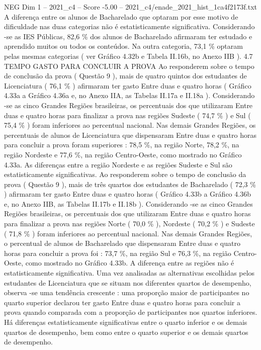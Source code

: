 \begin{textsample}{NEG Dim 1 – 2021\_c4 – Score -5.00 – 2021\_c4/enade\_2021\_hist\_1ca4f2173f.txt}
A diferença entre os alunos de Bacharelado que optaram por esse motivo de dificuldade nas duas categorias não é estatisticamente significativa.
Considerando -se as IES Públicas, 82,6 \% dos alunos de Bacharelado afirmaram ter estudado e aprendido muitos ou todos os conteúdos.
Na outra categoria, 73,1 \% optaram pelas mesmas categorias ( ver Gráfico 4.32b e Tabela II.16b, no Anexo IIB ). 4.7 TEMPO GASTO PARA CONCLUIR A PROVA Ao responderem sobre o tempo de conclusão da prova ( Questão 9 ), mais de quatro quintos dos estudantes de Licenciatura ( 76,1 \% ) afirmaram ter gasto Entre duas e quatro horas ( Gráfico 4.33a a Gráfico 4.36a e, no Anexo IIA, as Tabelas II.17a e II.18a ).
Considerando -se as cinco Grandes Regiões brasileiras, os percentuais dos que utilizaram Entre duas e quatro horas para finalizar a prova nas regiões Sudeste ( 74,7 \% ) e Sul ( 75,4 \% ) foram inferiores ao percentual nacional.
Nas demais Grandes Regiões, os percentuais de alunos de Licenciatura que dispensaram Entre duas e quatro horas para concluir a prova foram superiores : 78,5 \%, na região Norte, 78,2 \%, na região Nordeste e 77,6 \%, na região Centro-Oeste, como mostrado no Gráfico 4.33a.
As diferenças entre a região Nordeste e as regiões Sudeste e Sul são estatisticamente significativas.
Ao responderem sobre o tempo de conclusão da prova ( Questão 9 ), mais de três quartos dos estudantes de Bacharelado ( 72,3 \% ) afirmaram ter gasto Entre duas e quatro horas ( Gráfico 4.33b a Gráfico 4.36b e, no Anexo IIB, as Tabelas II.17b e II.18b ).
Considerando -se as cinco Grandes Regiões brasileiras, os percentuais dos que utilizaram Entre duas e quatro horas para finalizar a prova nas regiões Norte ( 70,0 \% ), Nordeste ( 70,2 \% ) e Sudeste ( 71,8 \% ) foram inferiores ao percentual nacional.
Nas demais Grandes Regiões, o percentual de alunos de Bacharelado que dispensaram Entre duas e quatro horas para concluir a prova foi : 73,7 \%, na região Sul e 76,3 \%, na região Centro-Oeste, como mostrado no Gráfico 4.33b.
A diferença entre as regiões não é estatisticamente significativa.
Uma vez analisadas as alternativas escolhidas pelos estudantes de Licenciatura que se situam nos diferentes quartos de desempenho, observa -se uma tendência crescente : uma proporção maior de participantes no quarto superior declarou ter gasto Entre duas e quatro horas para concluir a prova quando comparada com a proporção de participantes nos quartos inferiores.
Há diferenças estatisticamente significativas entre o quarto inferior e os demais quartos de desempenho, bem como entre o quarto superior e os demais quartos de desempenho.

\end{textsample}
